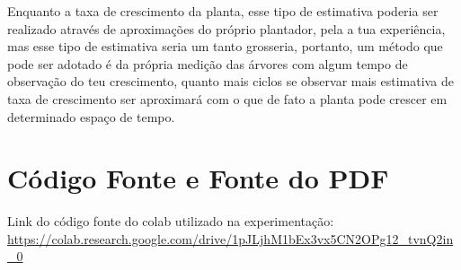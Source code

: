 \documentclass[a4paper, 12pt]{article}
\begin{document}
Enquanto a taxa de crescimento da planta, esse tipo de estimativa poderia ser realizado através de aproximações do próprio plantador, pela a tua experiência, mas esse tipo de estimativa seria um tanto grosseria, portanto, um método que pode ser adotado é da própria medição das árvores com algum tempo de observação do teu crescimento, quanto mais ciclos se observar mais estimativa de taxa de crescimento ser aproximará com o que de fato a planta pode crescer em determinado espaço de tempo.

\section{Código Fonte e Fonte do PDF}

Link do código fonte do colab utilizado na experimentação:\newline
\url{https://colab.research.google.com/drive/1pJLjhM1bEx3vx5CN2OPg12\_tvnQ2in\_0}



\end{document}
